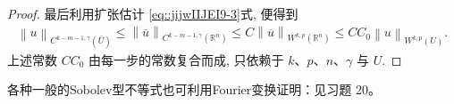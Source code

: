 \documentclass[../../main.tex]{subfiles}
\begin{document}
\begin{proof}
最后利用扩张估计 \eqref{eq::jijwIIJEI9-3}式, 便得到
\begin{align*}
\left\| u \right\| _{C^{k-m-1,\gamma}(\overline{U})}\leqslant \left\| \overline{u} \right\| _{C^{k-m-1,\gamma}(\mathbb{R} ^n)}\leqslant C\left\| \overline{u} \right\| _{W^{k,p}(\mathbb{R} ^n)}\leqslant CC_0\left\| u \right\| _{W^{k,p}(U)}.
\end{align*}
上述常数 $CC_0$ 由每一步的常数复合而成, 只依赖于 $k$、$p$、$n$、$\gamma$ 与 $U$.
\end{proof}

各种一般的Sobolev型不等式也可利用Fourier变换证明：见习题 20。
\end{document}
